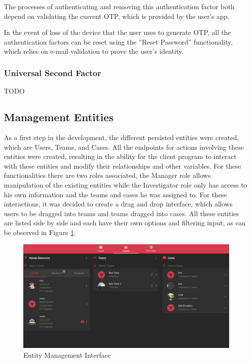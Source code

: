 The processes of authenticating and removing this authentication factor both depend on validating the current OTP, which is provided by the user's app.

In the event of loss of the device that the user uses to generate OTP, all the authentication factors can be reset using the ''Reset Password'' functionality, which relies on e-mail validation to prove the user's identity.

\subsubsection*{Universal Second Factor}

TODO

\subsection{Management Entities}

As a first step in the development, the different persisted entities were created, which are Users, Teams, and Cases. All the endpoints for actions involving these 
entities were created, resulting in the ability for the client program to interact with these entities and modify their relationships and other variables.
For these functionalities there are two roles associated, the Manager role allows manipulation of the existing entities while the Investigator role only has access to his
own information and the teams and cases he was assigned to. For these interactions, it was decided to create a drag and drop interface, which allows users to be dragged into
teams and teams dragged into cases. All these entities are listed side by side and each have their own options and filtering input, as can be observed in Figure \ref{fig:users}.

\begin{figure}[ht]
 \centering
 \includegraphics[width=1\linewidth]{imgs/users.png}
 \caption{Entity Management Interface}
 \label{fig:users}
\end{figure}

